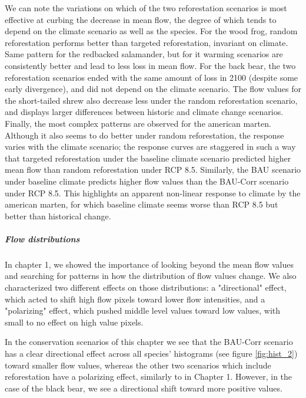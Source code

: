 {We can note the variations on which of the two reforestation scenarios is most effective at curbing the decrease in mean flow, the degree of which tends to depend on the climate scenario as well as the species. For the wood frog, random reforestation performs better than targeted reforestation, invariant on climate. Same pattern for the redbacked salamander, but for it warming scenarios are consistently better and lead to less loss in mean flow. For the back bear, the two reforestation scenarios ended with the same amount of loss in 2100 (despite some early divergence), and did not depend on the climate scenario. The flow values for the short-tailed shrew also decrease less under the random reforestation scenario, and displays larger differences between historic and climate change scenarios. Finally, the most complex patterns are observed for the american marten.  Although it also seems to do better under random reforestation,  the response varies with the climate scenario; the response curves are staggered in such a way that targeted reforestation under the baseline climate scenario predicted higher mean flow than random reforestation under RCP 8.5. Similarly, the BAU scenario under baseline climate predicts higher flow values than the BAU-Corr scenario under RCP 8.5. This highlights an apparent non-linear response to climate by the american marten, for which baseline climate seems worse than RCP 8.5 but better than historical change.

\vspace{1em}

\subparagraph*{\textit{Flow distributions}} In chapter 1, we showed the importance of looking beyond the mean flow values and searching for patterns in how the distribution of flow values change. We also characterized two different effects on those distributions: a "directional" effect, which acted to shift high flow pixels toward lower flow intensities, and a "polarizing" effect, which pushed middle level values toward low values, with small to no effect on high value pixels.

In the conservation scenarios of this chapter we see that the BAU-Corr scenario has a clear directional effect across all species' histograms (see figure \ref{fig:hist_2}) toward smaller flow values, whereas the other two scenarios which include reforestation have a polarizing effect, similarly to in Chapter 1. However, in the case of the black bear, we see a directional shift toward more positive values.

\vspace{1em}

}
